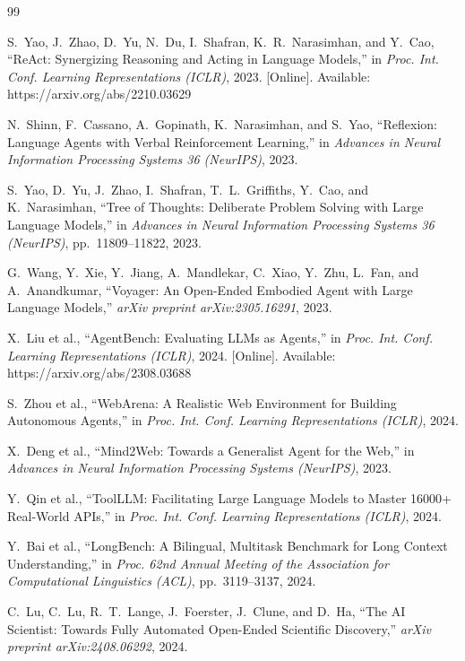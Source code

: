 \documentclass[conference]{IEEEtran}
\begin{document}
\begin{thebibliography}{99}

S.~Yao, J.~Zhao, D.~Yu, N.~Du, I.~Shafran, K.~R.~Narasimhan, and Y.~Cao,
``{ReAct}: Synergizing Reasoning and Acting in Language Models,''
in \textit{Proc. Int. Conf. Learning Representations (ICLR)}, 2023.
[Online]. Available: https://arxiv.org/abs/2210.03629

N.~Shinn, F.~Cassano, A.~Gopinath, K.~Narasimhan, and S.~Yao,
``Reflexion: Language Agents with Verbal Reinforcement Learning,''
in \textit{Advances in Neural Information Processing Systems 36 (NeurIPS)}, 2023.

S.~Yao, D.~Yu, J.~Zhao, I.~Shafran, T.~L.~Griffiths, Y.~Cao, and K.~Narasimhan,
``Tree of Thoughts: Deliberate Problem Solving with Large Language Models,''
in \textit{Advances in Neural Information Processing Systems 36 (NeurIPS)}, pp.~11809--11822, 2023.

G.~Wang, Y.~Xie, Y.~Jiang, A.~Mandlekar, C.~Xiao, Y.~Zhu, L.~Fan, and A.~Anandkumar,
``Voyager: An Open-Ended Embodied Agent with Large Language Models,''
\textit{arXiv preprint arXiv:2305.16291}, 2023.

X.~Liu et al.,
``{AgentBench}: Evaluating {LLMs} as Agents,''
in \textit{Proc. Int. Conf. Learning Representations (ICLR)}, 2024.
[Online]. Available: https://arxiv.org/abs/2308.03688

S.~Zhou et al.,
``{WebArena}: A Realistic Web Environment for Building Autonomous Agents,''
in \textit{Proc. Int. Conf. Learning Representations (ICLR)}, 2024.

X.~Deng et al.,
``{Mind2Web}: Towards a Generalist Agent for the Web,''
in \textit{Advances in Neural Information Processing Systems (NeurIPS)}, 2023.

Y.~Qin et al.,
``{ToolLLM}: Facilitating Large Language Models to Master 16000+ Real-World {APIs},''
in \textit{Proc. Int. Conf. Learning Representations (ICLR)}, 2024.

Y.~Bai et al.,
``{LongBench}: A Bilingual, Multitask Benchmark for Long Context Understanding,''
in \textit{Proc. 62nd Annual Meeting of the Association for Computational Linguistics (ACL)}, pp.~3119--3137, 2024.

C.~Lu, C.~Lu, R.~T.~Lange, J.~Foerster, J.~Clune, and D.~Ha,
``The {AI} Scientist: Towards Fully Automated Open-Ended Scientific Discovery,''
\textit{arXiv preprint arXiv:2408.06292}, 2024.


\end{thebibliography}
\end{document}
